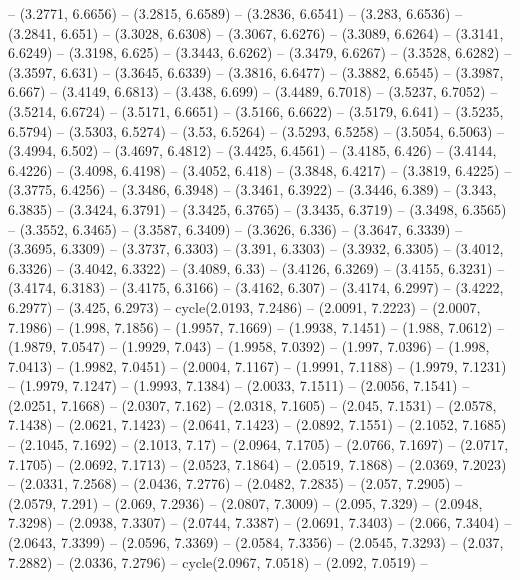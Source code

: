 {  -- (3.2771, 6.6656) -- (3.2815, 6.6589) -- (3.2836, 6.6541) -- (3.283, 6.6536)
   -- (3.2841, 6.651) -- (3.3028, 6.6308) -- (3.3067, 6.6276) -- (3.3089, 
  6.6264) -- (3.3141, 6.6249) -- (3.3198, 6.625) -- (3.3443, 6.6262) -- (3.3479,
   6.6267) -- (3.3528, 6.6282) -- (3.3597, 6.631) -- (3.3645, 6.6339) -- 
  (3.3816, 6.6477) -- (3.3882, 6.6545) -- (3.3987, 6.667) -- (3.4149, 6.6813) --
   (3.438, 6.699) -- (3.4489, 6.7018) -- (3.5237, 6.7052) -- (3.5214, 6.6724) --
   (3.5171, 6.6651) -- (3.5166, 6.6622) -- (3.5179, 6.641) -- (3.5235, 6.5794) 
  -- (3.5303, 6.5274) -- (3.53, 6.5264) -- (3.5293, 6.5258) -- (3.5054, 6.5063) 
  -- (3.4994, 6.502) -- (3.4697, 6.4812) -- (3.4425, 6.4561) -- (3.4185, 6.426) 
  -- (3.4144, 6.4226) -- (3.4098, 6.4198) -- (3.4052, 6.418) -- (3.3848, 6.4217)
   -- (3.3819, 6.4225) -- (3.3775, 6.4256) -- (3.3486, 6.3948) -- (3.3461, 
  6.3922) -- (3.3446, 6.389) -- (3.343, 6.3835) -- (3.3424, 6.3791) -- (3.3425, 
  6.3765) -- (3.3435, 6.3719) -- (3.3498, 6.3565) -- (3.3552, 6.3465) -- 
  (3.3587, 6.3409) -- (3.3626, 6.336) -- (3.3647, 6.3339) -- (3.3695, 6.3309) --
   (3.3737, 6.3303) -- (3.391, 6.3303) -- (3.3932, 6.3305) -- (3.4012, 6.3326) 
  -- (3.4042, 6.3322) -- (3.4089, 6.33) -- (3.4126, 6.3269) -- (3.4155, 6.3231) 
  -- (3.4174, 6.3183) -- (3.4175, 6.3166) -- (3.4162, 6.307) -- (3.4174, 6.2997)
   -- (3.4222, 6.2977) -- (3.425, 6.2973) -- cycle(2.0193, 7.2486) -- (2.0091, 
  7.2223) -- (2.0007, 7.1986) -- (1.998, 7.1856) -- (1.9957, 7.1669) -- (1.9938,
   7.1451) -- (1.988, 7.0612) -- (1.9879, 7.0547) -- (1.9929, 7.043) -- (1.9958,
   7.0392) -- (1.997, 7.0396) -- (1.998, 7.0413) -- (1.9982, 7.0451) -- (2.0004,
   7.1167) -- (1.9991, 7.1188) -- (1.9979, 7.1231) -- (1.9979, 7.1247) -- 
  (1.9993, 7.1384) -- (2.0033, 7.1511) -- (2.0056, 7.1541) -- (2.0251, 7.1668) 
  -- (2.0307, 7.162) -- (2.0318, 7.1605) -- (2.045, 7.1531) -- (2.0578, 7.1438) 
  -- (2.0621, 7.1423) -- (2.0641, 7.1423) -- (2.0892, 7.1551) -- (2.1052, 
  7.1685) -- (2.1045, 7.1692) -- (2.1013, 7.17) -- (2.0964, 7.1705) -- (2.0766, 
  7.1697) -- (2.0717, 7.1705) -- (2.0692, 7.1713) -- (2.0523, 7.1864) -- 
  (2.0519, 7.1868) -- (2.0369, 7.2023) -- (2.0331, 7.2568) -- (2.0436, 7.2776) 
  -- (2.0482, 7.2835) -- (2.057, 7.2905) -- (2.0579, 7.291) -- (2.069, 7.2936) 
  -- (2.0807, 7.3009) -- (2.095, 7.329) -- (2.0948, 7.3298) -- (2.0938, 7.3307) 
  -- (2.0744, 7.3387) -- (2.0691, 7.3403) -- (2.066, 7.3404) -- (2.0643, 7.3399)
   -- (2.0596, 7.3369) -- (2.0584, 7.3356) -- (2.0545, 7.3293) -- (2.037, 
  7.2882) -- (2.0336, 7.2796) -- cycle(2.0967, 7.0518) -- (2.092, 7.0519) -- 
}
